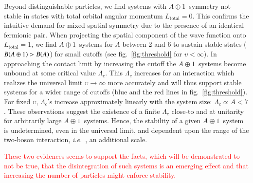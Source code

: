 \documentclass[preprint,12pt]{elsarticle}
\newcommand{\lc}{\ensuremath{\Lambda_c}}
\newcommand{\abb}{\mbox{\ensuremath{A\oplus 1}}}
\newcommand{\red}[1]{\textcolor{red}{#1}}
\newcommand{\ie}{\textit{i.e.}~}
\begin{document}
Beyond distinguishable particles, we find systems with \abb~symmetry not stable in states with total orbital angular momentum $L_\text{total}=0$. This confirms the intuitive demand for mixed spatial symmetry due to the presence of an identical fermionic pair.
When projecting the spatial component of the wave function onto \mbox{$L_\text{total}=1$}, we find \abb~systems for $A$ between 2 and 6 to sustain stable states \mbox{($B(\abb)>B(A)$)} for small cutoffs (see fig.~\ref{fig:threshold} for $\upsilon<\infty$).
In approaching the contact limit by increasing the cutoff the \abb~systems become unbound at some critical value $\lc$.
%
This $\lc$ increases for an interaction which realizes the universal limit $\upsilon\rightarrow\infty$ more accurately 
and will thus support stable systems for a wider range of cutoffs (blue and the red lines in fig.~\ref{fig:threshold}).
For fixed $\upsilon$, $\lc$'s increase approximately linearly with the system size: \mbox{$\lc\propto A<7$}.
These observations suggest the existence of a finite $\lc$ close-to and at unitarity for arbitrarily large \abb~systems.
Hence, the stability of a given \abb~system is undetermined, even in the universal limit, and dependent upon the range of
the two-boson interaction, \ie, an additional scale.

\red{These two evidences seems to support the facts, which will be demonstrated to not be true, that the disintegration of such systems is an emerging effect and that increasing the number of particles might enforce stability.}
\end{document}

